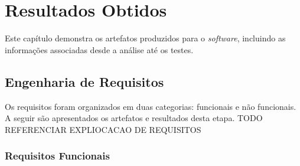 \chapter{Resultados Obtidos}
Este capítulo demonstra os artefatos produzidos para o \textit{software}, incluindo 
as informações associadas desde a análise até os testes.

\section{Engenharia de Requisitos}

Os requisitos foram organizados em duas categorias: funcionais e não funcionais. A seguir são apresentados os artefatos e resultados desta etapa.
 TODO REFERENCIAR EXPLIOCACAO DE REQUISITOS
\subsection{Requisitos Funcionais}

